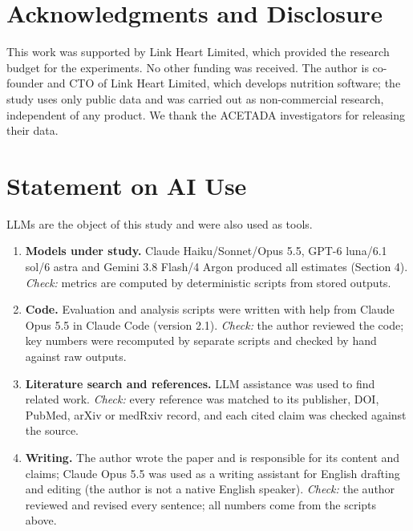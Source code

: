 \documentclass[
  11pt,
  letterpaper]{article}
\providecommand{\tightlist}{%
  \setlength{\itemsep}{0pt}\setlength{\parskip}{0pt}}
\begin{document}
\section*{Acknowledgments and Disclosure}\label{acknowledgments-and-disclosure}

This work was supported by Link Heart Limited, which provided the research budget for the experiments. No
other funding was received. The author is co-founder and CTO of Link Heart Limited, which develops nutrition
software; the study uses only public data and was carried out as non-commercial research, independent of any
product. We thank the ACETADA investigators for releasing their data.

\section*{Statement on AI Use}\label{statement-on-ai-use}

LLMs are the object of this study and were also used as tools.

\begin{enumerate}
\def\labelenumi{\arabic{enumi}.}
\tightlist
\item
  \textbf{Models under study.} Claude Haiku/Sonnet/Opus 5.5, GPT-6 luna/6.1 sol/6 astra and Gemini 3.8 Flash/4
  Argon produced all estimates (Section 4). \emph{Check:} metrics are computed by deterministic scripts from
  stored outputs.
\item
  \textbf{Code.} Evaluation and analysis scripts were written with help from Claude Opus 5.5 in Claude Code
  (version 2.1). \emph{Check:} the author reviewed the code; key numbers were recomputed by separate scripts
  and checked by hand against raw outputs.
\item
  \textbf{Literature search and references.} LLM assistance was used to find related work. \emph{Check:} every
  reference was matched to its publisher, DOI, PubMed, arXiv or medRxiv record, and each cited claim was
  checked against the source.
\item
  \textbf{Writing.} The author wrote the paper and is responsible for its content and claims; Claude Opus 5.5
  was used as a writing assistant for English drafting and editing (the author is not a native English
  speaker). \emph{Check:} the author reviewed and revised every sentence; all numbers come from the scripts
  above.
\end{enumerate}
\end{document}

